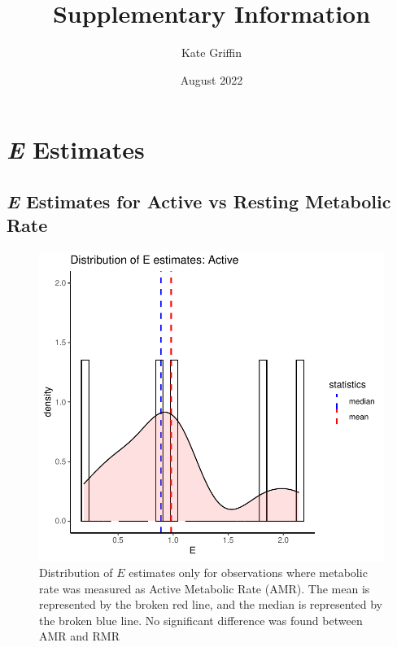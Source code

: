 \documentclass{article}
\title{Supplementary Information}
\author{Kate Griffin}
\date{August 2022}
\begin{document}
\maketitle
\vspace*{4\baselineskip}
\tableofcontents
\clearpage
\tiny
\centering
\tiny
\section{\emph{E} Estimates}

\subsection{\emph{E} Estimates for Active vs Resting Metabolic Rate}

\begin{figure}[h]
    \centering
    \includegraphics[width=6in]{active.pdf}
    \caption{\label{fig:S1} Distribution of \emph{$E$} estimates only for observations where metabolic rate was measured as Active Metabolic Rate (AMR). The mean is represented by the broken red line, and the median is represented by the broken blue line. No significant difference was found between AMR and RMR}
\end{figure}
\end{document}
